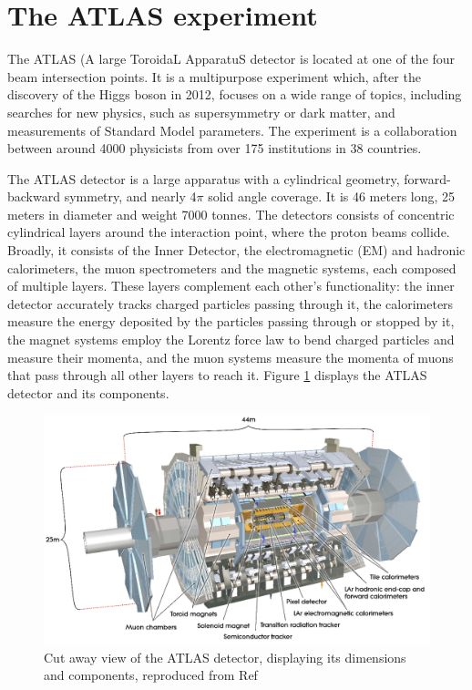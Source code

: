 \documentclass[12pt,a4paper,openright,twoside]{report}
\begin{document}
\section{The ATLAS experiment}
The ATLAS (A large ToroidaL ApparatuS detector is located at one of the four beam intersection points. It is a multipurpose experiment which, after the discovery of the Higgs boson in 2012, focuses on a wide range of topics, including searches for new physics, such as supersymmetry or dark matter, and measurements of Standard Model parameters. The experiment is a collaboration between around 4000 physicists from over 175 institutions in 38 countries.

The ATLAS detector is a large apparatus with a cylindrical geometry, forward-backward symmetry, and nearly 4$\pi$ solid angle coverage. It is 46 meters long, 25 meters in diameter and weight 7000 tonnes. The detectors consists of concentric cylindrical layers around the interaction point, where the proton beams collide. Broadly, it consists of the  Inner Detector, the electromagnetic (EM) and hadronic calorimeters, the muon spectrometers and the magnetic systems, each composed of multiple layers. These layers complement each other's functionality: the inner detector accurately tracks charged particles passing through it, the calorimeters measure the energy deposited by the particles passing through or stopped by it, the magnet systems employ the Lorentz force law to bend charged particles and measure their momenta, and the muon systems measure the momenta of muons that pass through all other layers to reach it. Figure \ref{fig:ATLAS} displays the ATLAS detector and its components.

\begin{figure}[h]
\centering
\includegraphics[width=\textwidth]{ATLAS.png}
\caption{Cut away view of the ATLAS detector, displaying its dimensions and components, reproduced from Ref \cite{ATLAS_detector}}
\label{fig:ATLAS}
\end{figure}
\end{document}
